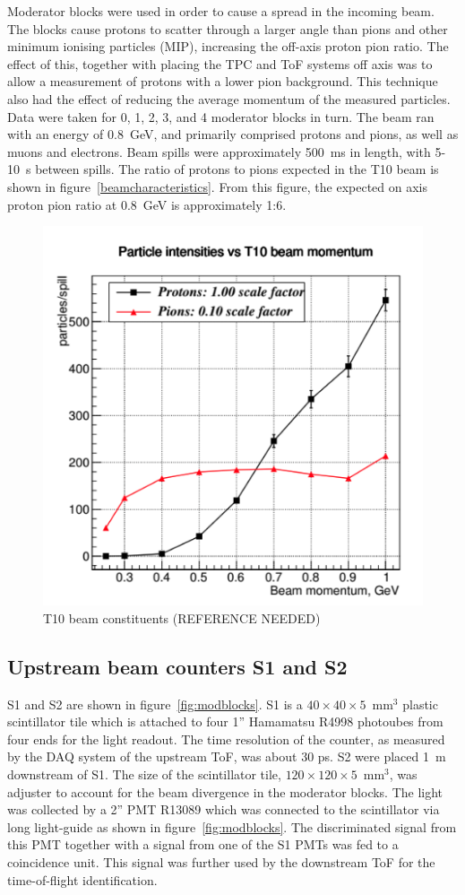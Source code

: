     Moderator blocks were used in order to cause a spread in the incoming beam.
    The blocks cause protons to scatter through a larger angle than pions and other minimum ionising particles (MIP), increasing the off-axis proton pion ratio.
    The effect of this, together with placing the TPC and ToF systems off axis was to allow a measurement of protons with a lower pion background.
    This technique also had the effect of reducing the average momentum of the measured particles.
    Data were taken for 0, 1, 2, 3, and 4 moderator blocks in turn.
    The beam ran with an energy of 0.8~GeV, and primarily comprised protons and pions, as well as muons and electrons. 
    Beam spills were approximately 500~ms in length, with 5-10~s between spills.
    The ratio of protons to pions expected in the T10 beam  is shown in figure~\ref{beamcharacteristics}.
    From this figure, the expected on axis proton pion ratio at 0.8~GeV is approximately 1:6.
      \begin{figure}
      \centering
    \includegraphics[width=0.6\linewidth]{files/Figures/offaxismeasurement.png}
    	\caption{T10 beam constituents (REFERENCE NEEDED)}
    		\label{fig:beamcharacteristics}
    \end{figure}
    
    
	\subsection{Upstream beam counters S1 and S2}
	
	S1 and S2 are shown in figure~\ref{fig:modblocks}. 
    S1 is a $40\times40\times5$~mm$^3$ plastic scintillator tile which is attached to four 1'' Hamamatsu R4998 photoubes from four ends for the light readout. 
    The time resolution of the counter, as measured by the DAQ system of the upstream ToF, was about 30 ps.
    S2 were placed 1~m downstream of S1. The size of the scintillator tile,  $120\times120\times5$~mm$^3$, was adjuster to account for the beam divergence in the moderator blocks. The light was collected by a 2'' PMT R13089 which was connected to the scintillator via long light-guide as shown in figure~\ref{fig:modblocks}. 
    The discriminated signal from this PMT together with a signal from one of the S1 PMTs was fed to a coincidence unit.  This signal was further used by the downstream ToF for the time-of-flight identification.
    
